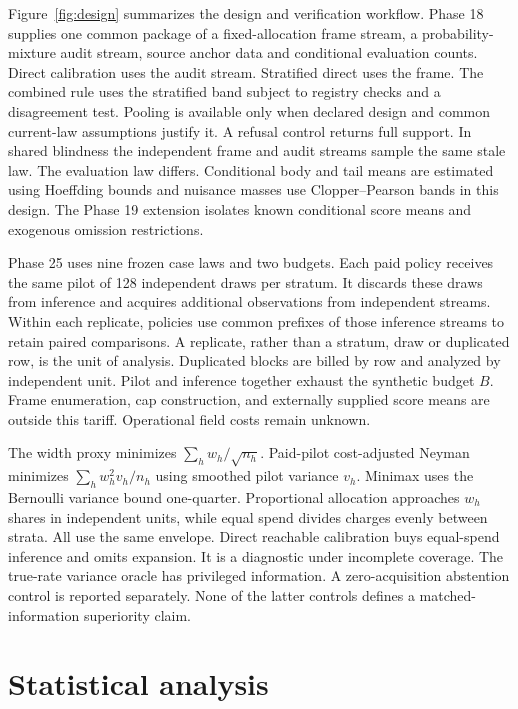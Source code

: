 \documentclass[article,nojss]{jss}
\begin{document}
Figure~\ref{fig:design} summarizes the design and verification workflow.
Phase 18 supplies one common package of a fixed-allocation frame stream,
a probability-mixture audit stream, source anchor data and conditional
evaluation counts. Direct calibration uses the audit stream. Stratified
direct uses the frame. The combined rule uses the stratified band
subject to registry checks and a disagreement test. Pooling is available
only when declared design and common current-law assumptions justify it.
A refusal control returns full support. In shared blindness the
independent frame and audit streams sample the same stale law. The
evaluation law differs. Conditional body and tail means are estimated
using Hoeffding bounds and nuisance masses use Clopper--Pearson bands in
this design. The Phase 19 extension isolates known conditional score
means and exogenous omission restrictions.

Phase 25 uses nine frozen case laws and two budgets. Each paid policy
receives the same pilot of 128 independent draws per stratum. It
discards these draws from inference and acquires additional observations
from independent streams. Within each replicate, policies use common
prefixes of those inference streams to retain paired comparisons. A
replicate, rather than a stratum, draw or duplicated row, is the unit of
analysis. Duplicated blocks are billed by row and analyzed by
independent unit. Pilot and inference together exhaust the synthetic
budget \(B\). Frame enumeration, cap construction, and externally supplied
score means are outside this tariff. Operational field costs remain
unknown.

The width proxy minimizes \(\sum_h w_h\allowbreak/\sqrt{n_h}\).
Paid-pilot cost-adjusted Neyman minimizes \(\sum_h w_h^2
v_h\allowbreak/n_h\) using smoothed pilot variance \(v_h\). Minimax uses
the Bernoulli variance bound one-quarter. Proportional allocation
approaches \(w_h\) shares in independent units, while equal spend
divides charges evenly between strata. All use the same envelope. Direct
reachable calibration buys equal-spend inference and omits expansion. It
is a diagnostic under incomplete coverage. The true-rate variance oracle
has privileged information. A zero-acquisition abstention control is
reported separately. None of the latter controls defines a
matched-information superiority claim.

\section{Statistical analysis}
\end{document}
